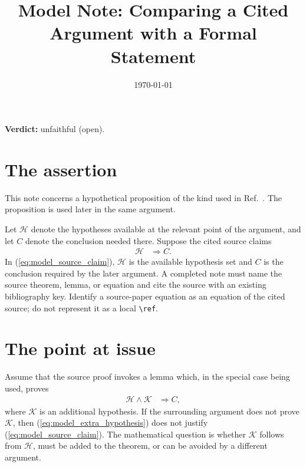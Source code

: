 \documentclass{article}
\title{Model Note: Comparing a Cited Argument with a Formal Statement}
\author{}
\date{\today}
\providecommand{\gapnote}[2]{%
    \par\noindent\textbf{Verdict:} #1 (#2).\par}
\begin{document}
\maketitle
\gapnote{unfaithful}{open}


\section{The assertion}

This note concerns a hypothetical proposition of the kind used in
Ref.~\cite{Wolf2012Quantum}. The proposition is used later in the same
argument.

Let $\mathcal H$ denote the hypotheses available at the relevant point of the
argument, and let $C$ denote the conclusion needed there. Suppose the cited
source claims
\begin{align}
    \mathcal H &\Longrightarrow C.
    \label{eq:model_source_claim}
\end{align}
In (\ref{eq:model_source_claim}), $\mathcal H$ is the available hypothesis set
and $C$ is the conclusion required by the later argument. A completed note must
name the source theorem, lemma, or equation and cite the source with an existing
bibliography key. Identify a source-paper equation as an equation of the cited
source; do not represent it as a local \verb|\ref|.

\section{The point at issue}

Assume that the source proof invokes a lemma which, in the special case being
used, proves
\begin{align}
    \mathcal H\wedge\mathcal K &\Longrightarrow C,
    \label{eq:model_extra_hypothesis}
\end{align}
where $\mathcal K$ is an additional hypothesis. If the surrounding argument
does not prove $\mathcal K$, then
(\ref{eq:model_extra_hypothesis}) does not justify
(\ref{eq:model_source_claim}). The mathematical question is whether
$\mathcal K$ follows from $\mathcal H$, must be added to the theorem, or can be
avoided by a different argument.
\end{document}

